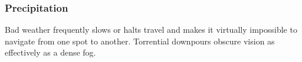 
\subsubsection{Precipitation}
Bad weather frequently slows or halts travel and makes it virtually impossible to navigate from one spot to another. Torrential downpours obscure vision as effectively as a dense fog.

